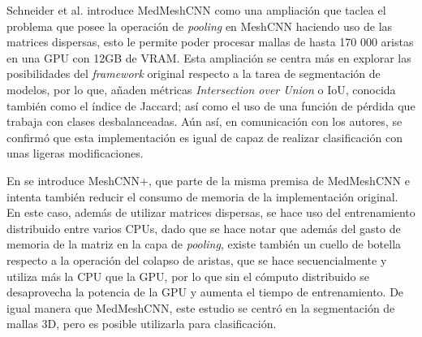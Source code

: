 Schneider et al. introduce MedMeshCNN \cite{schneider_medmeshcnn_2021} como una ampliación que taclea el problema que posee la operación de \textit{pooling} en MeshCNN haciendo uso de las matrices dispersas, esto le permite poder procesar mallas de hasta 170 000 aristas en una GPU con 12GB de VRAM. Esta ampliación se centra más en explorar las posibilidades del \textit{framework} original respecto a la tarea de segmentación de modelos, por lo que, añaden métricas \textit{Intersection over Union} o IoU, conocida también como el índice de Jaccard; así como el uso de una función de pérdida que trabaja con clases desbalanceadas. Aún así, en comunicación con los autores, se confirmó que esta implementación es igual de capaz de realizar clasificación con unas ligeras modificaciones.

En \cite{mandado_surface_2021} se introduce MeshCNN+, que parte de la misma premisa de MedMeshCNN e intenta también reducir el consumo de memoria de la implementación original. En este caso, además de utilizar matrices dispersas, se hace uso del entrenamiento distribuido entre varios CPUs, dado que se hace notar que además del gasto de memoria de la matriz en la capa de \textit{pooling}, existe también un cuello de botella respecto a la operación del colapso de aristas, que se hace secuencialmente y utiliza más la CPU que la GPU, por lo que sin el cómputo distribuido se desaprovecha la potencia de la GPU y aumenta el tiempo de entrenamiento. De igual manera que MedMeshCNN, este estudio se centró en la segmentación de mallas 3D, pero es posible utilizarla para clasificación.